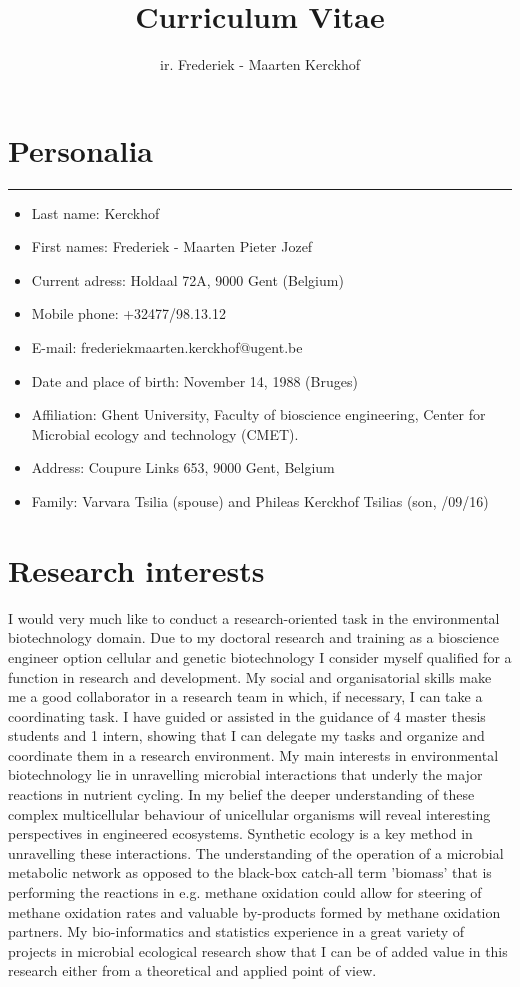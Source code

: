 \documentclass[a4paper,11pt,oneside]{article}
\title{Curriculum Vitae}
\author{ir. Frederiek - Maarten Kerckhof}
\begin{document}
\maketitle

\section*{Personalia}
\rule{\textwidth}{1pt}
\begin{itemize}
  \item Last name: Kerckhof
  \item First names: Frederiek - Maarten Pieter Jozef
  \item Current adress: Holdaal 72A, 9000 Gent (Belgium)
  \item Mobile phone: +32477/98.13.12
  \item E-mail: frederiekmaarten.kerckhof@ugent.be
  \item Date and place of birth: November 14, 1988 (Bruges)
  \item Affiliation: Ghent University, Faculty of bioscience engineering, Center for Microbial ecology and technology (CMET).
  \item Address: Coupure Links 653, 9000 Gent, Belgium
  \item Family: Varvara Tsilia (spouse) and Phileas Kerckhof Tsilias (son, /09/16)
\end{itemize}
\section*{Research interests}
I would very much like to conduct a research-oriented task in the environmental biotechnology domain. Due to my doctoral research and training as a bioscience engineer option cellular and genetic biotechnology I consider myself qualified for a function in research and development. My social and organisatorial skills make me a good collaborator in a research team in which, if necessary, I can take a coordinating task. I have guided or assisted in the guidance of 4 master thesis students and 1 intern, showing that I can delegate my tasks and organize and coordinate them in a research environment.  My main interests in environmental biotechnology lie in unravelling microbial interactions that underly the major reactions in nutrient cycling. In my belief the deeper understanding of these complex multicellular behaviour of unicellular organisms will reveal interesting perspectives in engineered ecosystems. Synthetic ecology is a key method in unravelling these interactions. The understanding of the operation of a microbial metabolic network  as opposed to the black-box catch-all term 'biomass' that is performing the reactions in e.g. methane oxidation could allow for steering of methane oxidation rates and valuable by-products formed by methane oxidation partners. My bio-informatics and statistics experience in a great variety of projects in microbial ecological research show that I can be of added value in this research either from a theoretical and applied point of view.
\end{document}
